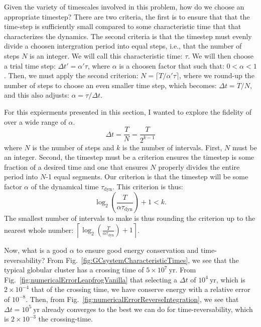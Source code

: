         Given the variety of timescales involved in this problem, how do we choose an appropriate timestep? There are two criteria, the first is to ensure that that the time-step is sufficiently small compared to some characteristic time that that characterizes the dynamics. The second criteria is that the timestep must evenly divide a choosen intergration period into equal steps, i.e., that the number of steps $N$ is an integer. We will call this characteristic time: $\tau$. We will then choose a trial time step: $\Delta t' = \alpha' \tau$, where $\alpha$ is a choosen factor that such that: $0<\alpha<1$. Then, we must apply the second criterion: $ N = \lceil T / \alpha ' \tau \rceil$, where we round-up the number of steps to choose an even smaller time step, which becomes: $\Delta t = T/N$, and this also adjusts: $\alpha = \tau / \Delta t$. 


        For this expierments presented in this section, I wanted to explore the fidelity of over a wide range of $\alpha$.
        \begin{equation}
            \Delta t = \frac{T}{N} = \frac{T}{2^{k-1}}
        \end{equation}
        where $N$ is the number of steps and $k$ is the number of intervals. First, $N$ must be an integer. Second, the timestep must be a  criterion ensures the timestep is some fraction of a desired time and one that ensures $N$ properly divides the entire period into $N$-1 equal segments. Our criterion is that the timestep will be some factor $\alpha$ of the dynamical time $\tau_\mathrm{dyn}$. This criterion is thus: 
        \begin{equation}
            \log_2\left(\frac{T}{\alpha \tau_\mathrm{dyn}}\right) + 1 < k.
        \end{equation}
        The smallest number of intervals to make is thus rounding the criterion up to the nearest whole number: $\left\lceil \log_2\left(\frac{T}{\alpha \tau_\mathrm{dyn}}\right) + 1  \right\rceil$. 
        
        Now, what is a good $\alpha$ to ensure good energy conservation and time-reversability? From Fig.~\ref{fig:GCsystemCharacteristicTimes}, we see that the typical globular cluster has a crossing time of $5\times10^{7}~\mathrm{yr}$. From Fig.~\ref{fig:numericalErrorLeapfrogVanilla} that selecting a $\Delta t$ of $10^{4}~\mathrm{yr}$, which is $2\times 10^{-4}$ that of the crossing time, we have conserve energy with a relative error of $10^{-8}$. Then, from Fig.~\ref{fig:numericalErrorReverseIntegration}, we see that $\Delta t= 10^{5}~\mathrm{yr}$ already converges to the best we can do for time-reversability, which is $2\times10^{-3}$ the crossing-time. 

